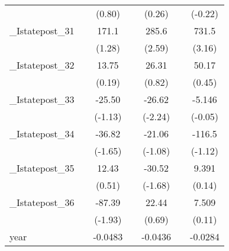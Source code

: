 {\begin{tabular}{l*{6}{c}}
            &                     &      (0.80)         &                     &      (0.26)         &                     &     (-0.22)         \\
[1em]
\_Istatepost\_31&                     &       171.1         &                     &       285.6\sym{*}  &                     &       731.5\sym{**} \\
            &                     &      (1.28)         &                     &      (2.59)         &                     &      (3.16)         \\
[1em]
\_Istatepost\_32&                     &       13.75         &                     &       26.31         &                     &       50.17         \\
            &                     &      (0.19)         &                     &      (0.82)         &                     &      (0.45)         \\
[1em]
\_Istatepost\_33&                     &      -25.50         &                     &      -26.62\sym{*}  &                     &      -5.146         \\
            &                     &     (-1.13)         &                     &     (-2.24)         &                     &     (-0.05)         \\
[1em]
\_Istatepost\_34&                     &      -36.82         &                     &      -21.06         &                     &      -116.5         \\
            &                     &     (-1.65)         &                     &     (-1.08)         &                     &     (-1.12)         \\
[1em]
\_Istatepost\_35&                     &       12.43         &                     &      -30.52         &                     &       9.391         \\
            &                     &      (0.51)         &                     &     (-1.68)         &                     &      (0.14)         \\
[1em]
\_Istatepost\_36&                     &      -87.39         &                     &       22.44         &                     &       7.509         \\
            &                     &     (-1.93)         &                     &      (0.69)         &                     &      (0.11)         \\
[1em]
year        &                     &     -0.0483\sym{***}&                     &     -0.0436\sym{***}&                     &     -0.0284         \\

\end{tabular}}
